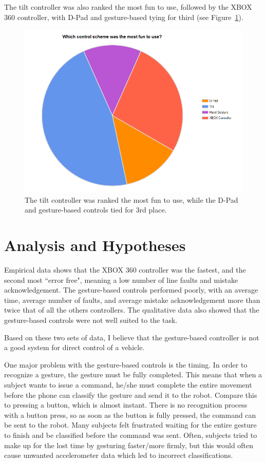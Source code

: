 \documentclass[12pt, letterpaper]{report}
\begin{document}
The tilt controller was also ranked the most fun to use, followed by the XBOX 360 controller, with D-Pad and gesture-based tying for third (see Figure~\ref{sm_53}).

\begin{figure}[h!]
	\centering
	\includegraphics[width=4.5in]{images/sm_53.png}
	\caption{The tilt controller was ranked the most fun to use, while the D-Pad and gesture-based controls tied for 3rd place.}
	\label{sm_53}
\end{figure}

\section{Analysis and Hypotheses}
Empirical data shows that the XBOX 360 controller was the fastest, and the second most ``error free", meaning a low number of line faults and mistake acknowledgement. The gesture-based controls performed poorly, with an average time, average number of faults, and average mistake acknowledgement more than twice that of all the others controllers. The qualitative data also showed that the gesture-based controls were not well suited to the task. 

Based on these two sets of data, I believe that the gesture-based controller is not a good system for direct control of a vehicle.

One major problem with the gesture-based controls is the timing. In order to recognize a gesture, the gesture must be fully completed. This means that when a subject wants to issue a command, he/she must complete the entire movement before the phone can classify the gesture and send it to the robot. Compare this to pressing a button, which is almost instant. There is no recognition process with a button press, so as soon as the button is fully pressed, the command can be sent to the robot. Many subjects felt frustrated waiting for the entire gesture to finish and be classified before the command was sent. Often, subjects tried to make up for the lost time by gesturing faster/more firmly, but this would often cause unwanted accelerometer data which led to incorrect classifications.
\end{document}
